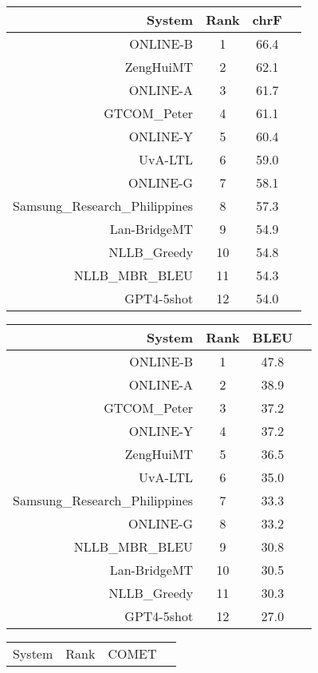 \documentclass[11pt]{article}
\begin{document}
\begin{table}  
\scriptsize\begin{subtable}[t]{0.33\textwidth}
\begin{tabular}{rccc}
\toprule 
System & Rank & chrF \\ 
\midrule 
ONLINE-B & 1 & 66.4 \\ 
ZengHuiMT & 2 & 62.1 \\ 
ONLINE-A & 3 & 61.7 \\ 
GTCOM\_Peter & 4 & 61.1 \\ 
ONLINE-Y & 5 & 60.4 \\ 
UvA-LTL & 6 & 59.0 \\ 
ONLINE-G & 7 & 58.1 \\ 
Samsung\_Research\_Philippines & 8 & 57.3 \\ 
Lan-BridgeMT & 9 & 54.9 \\ 
NLLB\_Greedy & 10 & 54.8 \\ 
NLLB\_MBR\_BLEU & 11 & 54.3 \\ 
GPT4-5shot & 12 & 54.0 \\ 
\bottomrule 
\end{tabular} 
\end{subtable} 
\begin{subtable}[t]{0.33\textwidth}
\begin{tabular}{rccc}
\toprule 
System & Rank & BLEU \\ 
\midrule 
ONLINE-B & 1 & 47.8 \\ 
ONLINE-A & 2 & 38.9 \\ 
GTCOM\_Peter & 3 & 37.2 \\ 
ONLINE-Y & 4 & 37.2 \\ 
ZengHuiMT & 5 & 36.5 \\ 
UvA-LTL & 6 & 35.0 \\ 
Samsung\_Research\_Philippines & 7 & 33.3 \\ 
ONLINE-G & 8 & 33.2 \\ 
NLLB\_MBR\_BLEU & 9 & 30.8 \\ 
Lan-BridgeMT & 10 & 30.5 \\ 
NLLB\_Greedy & 11 & 30.3 \\ 
GPT4-5shot & 12 & 27.0 \\ 
\bottomrule 
\end{tabular} 
\end{subtable} 
\begin{subtable}[t]{0.33\textwidth}
\begin{tabular}{rccc}
\toprule 
System & Rank & COMET \\ 

\end{tabular}
\end{subtable}
\end{table}
\end{document}
